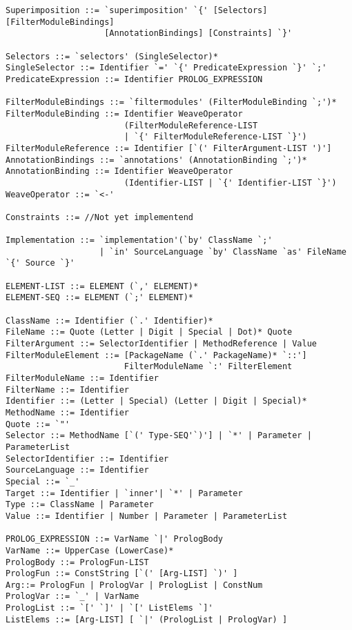 \begin{lstlisting}[label=lst::proposedgrammar,style=listing,language=ebnf]
Superimposition ::= `superimposition' `{' [Selectors] [FilterModuleBindings]
                    [AnnotationBindings] [Constraints] `}'

Selectors ::= `selectors' (SingleSelector)*
SingleSelector ::= Identifier `=' `{' PredicateExpression `}' `;'
PredicateExpression ::= Identifier PROLOG_EXPRESSION

FilterModuleBindings ::= `filtermodules' (FilterModuleBinding `;')*
FilterModuleBinding ::= Identifier WeaveOperator 
                        (FilterModuleReference-LIST 
                        | `{' FilterModuleReference-LIST `}')
FilterModuleReference ::= Identifier [`(' FilterArgument-LIST ')']
AnnotationBindings ::= `annotations' (AnnotationBinding `;')*
AnnotationBinding ::= Identifier WeaveOperator 
                        (Identifier-LIST | `{' Identifier-LIST `}')
WeaveOperator ::= `<-'

Constraints ::= //Not yet implementend

Implementation ::= `implementation'(`by' ClassName `;'
                   | `in' SourceLanguage `by' ClassName `as' FileName `{' Source `}'
                   
ELEMENT-LIST ::= ELEMENT (`,' ELEMENT)*
ELEMENT-SEQ ::= ELEMENT (`;' ELEMENT)*

ClassName ::= Identifier (`.' Identifier)*
FileName ::= Quote (Letter | Digit | Special | Dot)* Quote
FilterArgument ::= SelectorIdentifier | MethodReference | Value
FilterModuleElement ::= [PackageName (`.' PackageName)* `::'] 
                        FilterModuleName `:' FilterElement
FilterModuleName ::= Identifier
FilterName ::= Identifier
Identifier ::= (Letter | Special) (Letter | Digit | Special)*
MethodName ::= Identifier
Quote ::= `"'
Selector ::= MethodName [`(' Type-SEQ'`)'] | `*' | Parameter | ParameterList
SelectorIdentifier ::= Identifier
SourceLanguage ::= Identifier
Special ::= `_'
Target ::= Identifier | `inner'| `*' | Parameter
Type ::= ClassName | Parameter
Value ::= Identifier | Number | Parameter | ParameterList

PROLOG_EXPRESSION ::= VarName `|' PrologBody
VarName ::= UpperCase (LowerCase)*
PrologBody ::= PrologFun-LIST
PrologFun ::= ConstString [`(' [Arg-LIST] `)' ]
Arg::= PrologFun | PrologVar | PrologList | ConstNum
PrologVar ::= `_' | VarName
PrologList ::= `[' `]' | `[' ListElems `]'
ListElems ::= [Arg-LIST] [ `|' (PrologList | PrologVar) ]
\end{lstlisting}